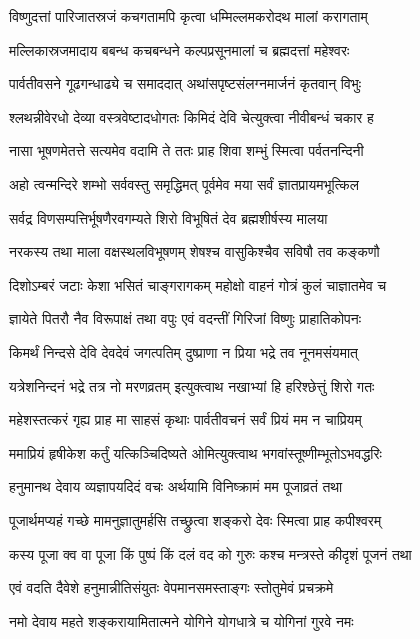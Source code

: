 \twolineshloka
{विष्णुदत्तां पारिजातस्रजं कचगतामपि}
{कृत्वा धम्मिल्लमकरोदथ मालां करागताम्}%

\twolineshloka
{मल्लिकास्रजमादाय बबन्ध कचबन्धने}
{कल्पप्रसूनमालां च ब्रह्मदत्तां महेश्वरः}%

\twolineshloka
{पार्वतीवसने गूढगन्धाढ्ये च समाददात्}
{अथांसपृष्टसंलग्नमार्जनं कृतवान् विभुः}%

\twolineshloka
{श्लथन्नीवेरधो देव्या वस्त्रवेष्टादधोगतः}
{किमिदं देवि चेत्युक्त्वा नीवीबन्धं चकार ह}%

\twolineshloka
{नासा भूषणमेतत्ते सत्यमेव वदामि ते}
{ततः प्राह शिवा शम्भुं स्मित्वा पर्वतनन्दिनी}%

\twolineshloka
{अहो त्वन्मन्दिरे शम्भो सर्ववस्तु समृद्धिमत्}
{पूर्वमेव मया सर्वं ज्ञातप्रायमभूत्किल}%

\twolineshloka
{सर्वद्र विणसम्पत्तिर्भूषणैरवगम्यते}
{शिरो विभूषितं देव ब्रह्मशीर्षस्य मालया}%

\twolineshloka
{नरकस्य तथा माला वक्षस्थलविभूषणम्}
{शेषश्च वासुकिश्चैव सविषौ तव कङ्कणौ}%

\twolineshloka
{दिशोऽम्बरं जटाः केशा भसितं चाङ्गरागकम्}
{महोक्षो वाहनं गोत्रं कुलं चाज्ञातमेव च}%

\twolineshloka
{ज्ञायेते पितरौ नैव विरूपाक्षं तथा वपुः}
{एवं वदन्तीं गिरिजां विष्णुः प्राहातिकोपनः}%

\twolineshloka
{किमर्थं निन्दसे देवि देवदेवं जगत्पतिम्}
{दुष्प्राणा न प्रिया भद्रे तव नूनमसंयमात्}%

\twolineshloka
{यत्रेशनिन्दनं भद्रे तत्र नो मरणव्रतम्}
{इत्युक्त्वाथ नखाभ्यां हि हरिश्छेत्तुं शिरो गतः}%

\twolineshloka
{महेशस्तत्करं गृह्य प्राह मा साहसं कृथाः}
{पार्वतीवचनं सर्वं प्रियं मम न चाप्रियम्}%

\twolineshloka
{ममाप्रियं हृषीकेश कर्तुं यत्किञ्चिदिष्यते}
{ओमित्युक्त्वाथ भगवांस्तूष्णीम्भूतोऽभवद्धरिः}%

\twolineshloka
{हनुमानथ देवाय व्यज्ञापयदिदं वचः}
{अर्थयामि विनिष्क्रामं मम पूजाव्रतं तथा}%

\twolineshloka
{पूजार्थमप्यहं गच्छे मामनुज्ञातुमर्हसि}
{तच्छ्रुत्वा शङ्करो देवः स्मित्वा प्राह कपीश्वरम्}%

\twolineshloka
{कस्य पूजा क्व वा पूजा किं पुष्पं किं दलं वद}
{को गुरुः कश्च मन्त्रस्ते कीदृशं पूजनं तथा}%

\twolineshloka
{एवं वदति दैवेशे हनुमान्नीतिसंयुतः}
{वेपमानसमस्ताङ्गः स्तोतुमेवं प्रचक्रमे}%

\twolineshloka
{नमो देवाय महते शङ्करायामितात्मने}
{योगिने योगधात्रे च योगिनां गुरवे नमः}%

